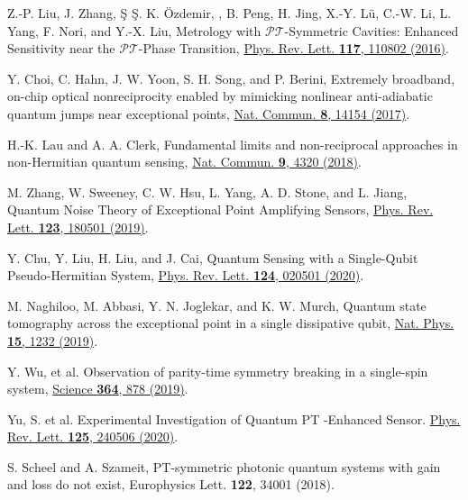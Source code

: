 \documentclass[twocolumn,prl,floatfix,citeautoscript,nofootinbib,superscriptaddress]{revtex4}
\begin{document}
\begin{thebibliography}{99}
 Z.-P. Liu, J. Zhang, \ifmmode\mbox{\c{S}}%
\else\c{S}\fi{}. K. \"{O}zdemir, , B. Peng, H. Jing, X.-Y. L\"{u}, C.-W. Li,
L. Yang, F. Nori, and Y.-X. Liu, Metrology with $\mathcal{PT}$-Symmetric
Cavities: Enhanced Sensitivity near the $\mathcal{PT}$-Phase Transition,
\href{https://doi.org/10.1103/PhysRevLett.117.110802}{Phys. Rev. Lett.
\textbf{117}, 110802 (2016)}.

 Y. Choi, C. Hahn, J. W. Yoon, S. H. Song, and P.
Berini, Extremely broadband, on-chip optical nonreciprocity enabled by
mimicking nonlinear anti-adiabatic quantum jumps near exceptional points,
\href{https://doi.org/10.1038/ncomms14154}{Nat. Commun. \textbf{8}, 14154
(2017)}.

 H.-K. Lau and A. A. Clerk, Fundamental limits and
non-reciprocal approaches in non-Hermitian quantum sensing, \href{https://doi.org/10.1038/s41467-018-06477-7}%
{Nat. Commun. \textbf{9}, 4320 (2018)}.

 M. Zhang, W. Sweeney, C. W. Hsu, L. Yang,
A. D. Stone, and L. Jiang, Quantum Noise Theory of Exceptional Point
Amplifying Sensors, \href{https://doi.org/10.1103/PhysRevLett.123.180501}{%
Phys. Rev. Lett. \textbf{123}, 180501 (2019)}.

 Y. Chu, Y. Liu, H. Liu, and J. Cai, Quantum
Sensing with a Single-Qubit Pseudo-Hermitian System, \href{https://doi.org/10.1103/PhysRevLett.124.020501}%
{Phys. Rev. Lett. \textbf{124}, 020501 (2020)}.

 M. Naghiloo, M. Abbasi, Y. N. Joglekar, and K. W. Murch,
Quantum state tomography across the exceptional point in a single
dissipative qubit, \href{https://doi.org/10.1038/s41567-019-0652-z}{Nat.
Phys. \textbf{15}, 1232 (2019)}.

 Y. Wu, et al. Observation of parity-time symmetry breaking in
a single-spin system, \href{https://doi.org/10.1126/science.aaw8205}{Science
\textbf{364}, 878 (2019)}.

 Yu, S. et al. Experimental Investigation of Quantum PT
-Enhanced Sensor. \href{https://doi.org/10.1103/PhysRevLett.125.240506}{%
Phys. Rev. Lett. \textbf{125}, 240506 (2020)}.


 S. Scheel and A. Szameit, PT-symmetric photonic
quantum systems with gain and loss do not exist, Europhysics Lett. \textbf{%
122}, 34001 (2018).


\end{thebibliography}
\end{document}
